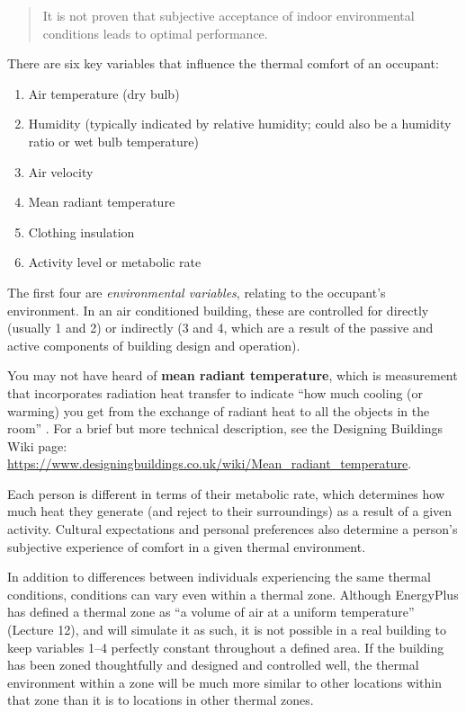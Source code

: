 \documentclass[10pt]{article}
\begin{document}
\begin{quote}
It is not proven that subjective acceptance of indoor environmental conditions leads to optimal performance. \cite{Wargocki2017-ny}
\end{quote}

\noindent
There are six key variables that influence the thermal comfort of an occupant:

\begin{enumerate}
    \item Air temperature (dry bulb)
    \item Humidity (typically indicated by relative humidity; could also be a humidity ratio or wet bulb temperature)
    \item Air velocity
    \item Mean radiant temperature
    \item Clothing insulation
    \item Activity level or metabolic rate
\end{enumerate}

The first four are \textit{environmental variables}, relating to the occupant's environment. In an air conditioned building, these are controlled for directly (usually 1 and 2) or indirectly (3 and 4, which are a result of the passive and active components of building design and operation). 

You may not have heard of \textbf{mean radiant temperature}, which is measurement that incorporates radiation heat transfer to indicate ``how much cooling (or warming) you get from the exchange of radiant heat to all the objects in the room'' \cite{noauthor_undated-kj}. For a brief but more technical description, see the Designing Buildings Wiki page: \url{https://www.designingbuildings.co.uk/wiki/Mean_radiant_temperature}.

Each person is different in terms of their metabolic rate, which determines how much heat they generate (and reject to their surroundings) as a result of a given activity. Cultural expectations and personal preferences also determine a person's subjective experience of comfort in a given thermal environment. 

In addition to differences between individuals experiencing the same thermal conditions, conditions can vary even within a thermal zone. Although EnergyPlus has defined a thermal zone as ``a volume of air at a uniform temperature'' (Lecture 12), and will simulate it as such, it is not possible in a real building to keep variables 1--4 perfectly constant throughout a defined area. If the building has been zoned thoughtfully and designed and controlled well, the thermal environment within a zone will be much more similar to other locations within that zone than it is to locations in other thermal zones.
\end{document}
